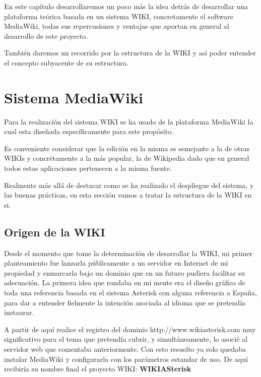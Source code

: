 
En este capítulo desarrollaremos un poco más la idea detrás de desarrollar una plataforma teórica basada en un sistema WIKI, concretamente el software MediaWiki, todas sus repercusiones y ventajas que aportan en general al desarrollo de este proyecto.

También daremos un recorrido por la estructura de la WIKI y así poder entender el concepto subyacente de su estructura.

\section{Sistema MediaWiki}

Para la realización del sistema WIKI se ha usado de la plataforma MediaWiki \cite{website:mediawiki} la cual esta diseñada específicamente para este propósito.

Es conveniente considerar que la edición en la misma es semejante a la de otras WIKIs y concrétamente a la más popular, la de Wikipedia dado que en general todos estas aplicaciones pertenecen a la misma fuente.

Realmente más allá de destacar como se ha realizado el despliegue del sistema, y las buenas prácticas, en esta sección vamos a tratar la estructura de la WIKI en si.

\subsection{Origen de la WIKI}

Desde el momento que tome la determinación de desarrollar la WIKI, mi primer planteamiento fue lanzarla públicamente a un servidor en Internet de mi propiedad y enmarcarla bajo un dominio que en un futuro pudiera facilitar su adecuación. La primera idea que rondaba en mi mente era el diseño gráfico de toda una referencia basada en el sistema Asterisk con alguna referencia a España, para dar a entender fielmente la intención asociada al idioma que se pretendía instaurar.

A partir de aquí realice el registro del dominio http://www.wikiasterisk.com muy significativo para el tema que pretendía cubrir, y simultáneamente, lo asocié al servidor web que comentaba anteriormente. Con esto resuelto ya solo quedaba instalar MediaWiki y configurarla con los parámetros estandar de uso. De aquí recibiría su nombre final el proyecto WIKI: \textbf{WIKIASterisk}

